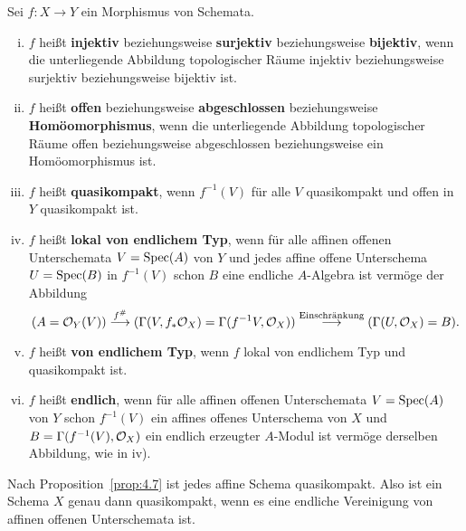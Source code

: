 \begin{defn}
\label{defn:6.8}
	Sei $f\colon X \to Y$ ein Morphismus von Schemata.
	\begin{enumerate}[i)]
		\item $f$ heißt \textbf{injektiv} beziehungsweise \textbf{surjektiv} beziehungsweise \textbf{bijektiv}, wenn die unterliegende Abbildung topologischer Räume injektiv beziehungsweise surjektiv beziehungsweise bijektiv ist.
		\item $f$ heißt \textbf{offen} beziehungsweise \textbf{abgeschlossen} beziehungsweise \textbf{Homöomorphismus}, wenn die unterliegende Abbildung topologischer Räume  offen beziehungsweise abgeschlossen beziehungsweise ein Homöomorphismus ist.
		\item $f$ heißt \textbf{quasikompakt}, wenn $f^{-1}(V)$ für alle $V$ quasikompakt und offen in $Y$ quasikompakt ist.
		\item $f$ heißt \textbf{lokal von endlichem Typ}, wenn für alle affinen offenen Unterschemata $V=\operatorname{Spec}(A)$ von $Y$ und jedes affine offene Unterschema $U = \operatorname{Spec}(B)$ in $f^{-1}(V)$ schon $B$ eine endliche $A$-Algebra ist vermöge der Abbildung
		\[
			(A = \mathcal{O}_{Y}(V))\overset{f^{\#}}{\longrightarrow}(\Gamma(V,f_*\mathcal{O}_X)=\Gamma(f^{-1}V,\mathcal{O}_X))\overset{\text{Einschränkung}}{\longrightarrow}(\Gamma(U,\mathcal{O}_X) = B).
		\]
		\item $f$ heißt \textbf{von endlichem Typ}, wenn $f$ lokal von endlichem Typ und quasikompakt ist.
		\item $f$ heißt \textbf{endlich}, wenn für alle affinen offenen Unterschemata $V = \operatorname{Spec}(A)$ von $Y$ schon $f^{-1}(V)$ ein affines offenes Unterschema von $X$ und $B = \Gamma(f^{-1}(V),\mathcal{O}_X)$ ein endlich erzeugter $A$-Modul ist vermöge derselben Abbildung, wie in iv).
	\end{enumerate}
\end{defn}

\begin{bem}
\label{bem:6.9}
	Nach Proposition~\ref{prop:4.7} ist jedes affine Schema quasikompakt. Also ist ein Schema $X$ genau dann quasikompakt, wenn es eine endliche Vereinigung von affinen offenen Unterschemata ist.
\end{bem}

